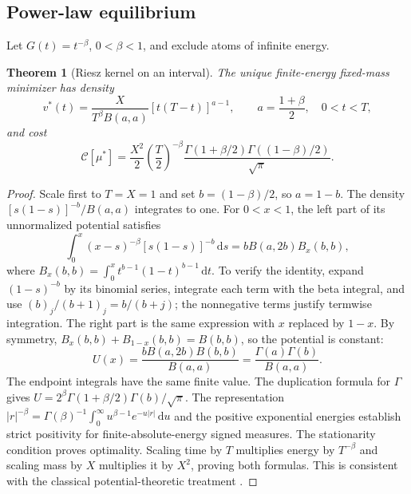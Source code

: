 \documentclass[11pt]{article}
\numberwithin{equation}{section}
\newtheorem{theorem}{Theorem}[section]
\theoremstyle{definition}
\theoremstyle{remark}
\theoremstyle{definition}
\newcommand{\dd}{\,\mathrm d}
\begin{document}
\subsection{Power-law equilibrium}
Let $G(t)=t^{-\beta}$, $0<\beta<1$, and exclude atoms of infinite energy.
\begin{theorem}[Riesz kernel on an interval]\label{thm:riesz}
The unique finite-energy fixed-mass minimizer has density
\begin{equation}\label{eq:rieszdensity}
 v^*(t)=\frac{X}{T^\beta B(a,a)}[t(T-t)]^{a-1},\qquad
 a=\frac{1+\beta}{2},\quad0<t<T,
\end{equation}
and cost
\begin{equation}\label{eq:rieszcost}
 \mathcal C[\mu^*]=\frac{X^2}{2}\left(\frac T2\right)^{-\beta}
 \frac{\Gamma(1+\beta/2)\Gamma((1-\beta)/2)}{\sqrt\pi}.
\end{equation}
\end{theorem}
\begin{proof}
Scale first to $T=X=1$ and set $b=(1-\beta)/2$, so $a=1-b$.
The density $[s(1-s)]^{-b}/B(a,a)$ integrates to one. For $0<x<1$, the
left part of its unnormalized potential satisfies
\[
 \int_0^x(x-s)^{-\beta}[s(1-s)]^{-b}\dd s
       =bB(a,2b)B_x(b,b),
\]
where $B_x(b,b)=\int_0^x t^{b-1}(1-t)^{b-1}\dd t$. To verify the identity,
expand $(1-s)^{-b}$ by its binomial series, integrate each term with the beta
integral, and use $(b)_j/(b+1)_j=b/(b+j)$; the nonnegative terms justify
termwise integration. The right part is the same expression with $x$ replaced
by $1-x$. By symmetry,
$B_x(b,b)+B_{1-x}(b,b)=B(b,b)$, so the potential is constant:
\[
 U(x)=\frac{bB(a,2b)B(b,b)}{B(a,a)}
     =\frac{\Gamma(a)\Gamma(b)}{B(a,a)}.
\]
The endpoint integrals have the same finite value. The duplication formula for
$\Gamma$ gives $U=2^\beta\Gamma(1+\beta/2)\Gamma(b)/\sqrt\pi$.
The representation
$|r|^{-\beta}=\Gamma(\beta)^{-1}\int_0^\infty u^{\beta-1}e^{-u|r|}\dd u$
and the positive exponential energies establish strict positivity for
finite-absolute-energy signed measures. The stationarity condition proves
optimality. Scaling time by $T$ multiplies energy by $T^{-\beta}$ and scaling
mass by $X$ multiplies it by $X^2$, proving both formulas. This is consistent
with the classical potential-theoretic treatment \citep{landkof1972,gsslynko2012}.
\end{proof}
\end{document}

